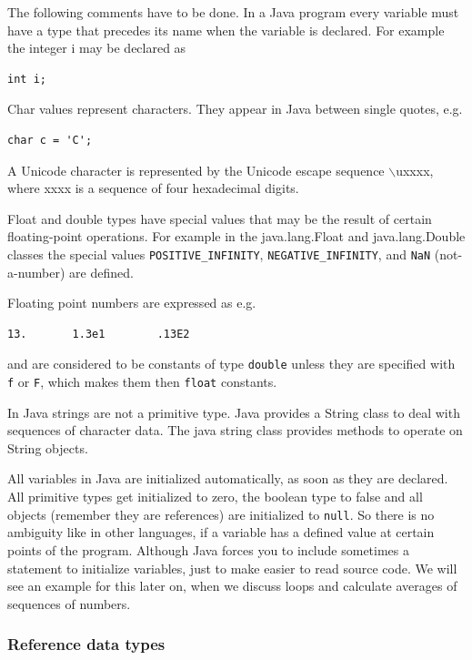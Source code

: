 The following comments have to be done. In a Java program every
variable must have a type that precedes its name when the variable is
declared. For example the integer i may be declared as

\begin{verbatim}
int i;
\end{verbatim}


Char values represent characters. They appear in Java between single
quotes, e.g.
\begin{verbatim}
char c = 'C';
\end{verbatim}
A Unicode character is represented by the Unicode escape sequence
$\backslash$uxxxx, where xxxx is a sequence of four hexadecimal digits.


Float and double types have special values that may be the result of
certain floating-point operations. For example in the java.lang.Float
and java.lang.Double classes the special values
\verb|POSITIVE_INFINITY|, \verb|NEGATIVE_INFINITY|, and 
\verb|NaN| (not-a-number) are
defined.

Floating point numbers are expressed as e.g.
\begin{verbatim}
13.       1.3e1        .13E2 
\end{verbatim}
and are considered to be constants of type \verb|double| 
unless they are specified with \verb|f| or \verb|F|, which makes them
then \verb|float| constants.

In Java strings are not a primitive type. Java provides a String
class to deal with sequences of character data. The java string
class provides methods to operate on String objects.

All variables in Java are initialized automatically, as soon as they
are declared. All primitive types get initialized to zero, the boolean type
to false and all objects (remember they are references) are initialized
to \verb|null|. So there is no ambiguity like in other languages, if
a variable has a defined value at certain points of the program. 
Although Java forces you to include sometimes a statement to
initialize variables, just to make easier to read source code.
We will see an example for this later on, when we discuss loops
and calculate averages of sequences of numbers.

\subsubsection{Reference data types}
\label{sec:Reference_data_types}

